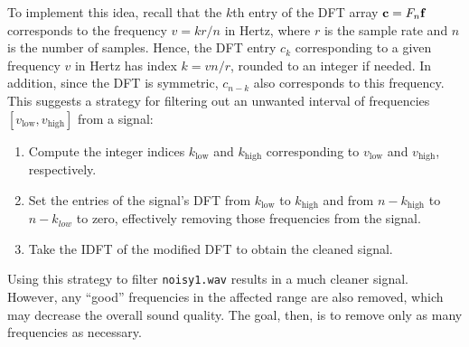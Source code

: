 To implement this idea, recall that the $k$th entry of the DFT array $\mathbf{c} = F_n \mathbf{f}$ corresponds to the frequency $v = k r / n$ in Hertz, where $r$ is the sample rate and $n$ is the number of samples.
Hence, the DFT entry $c_k$ corresponding to a given frequency $v$ in Hertz has index $k = v n / r$, rounded to an integer if needed.
In addition, since the DFT is symmetric, $c_{n-k}$ also corresponds to this frequency. %
This suggests a strategy for filtering out an unwanted interval of frequencies $[v_\text{low},v_\text{high}]$ from a signal:
\begin{enumerate}
\item Compute the integer indices $k_\text{low}$ and $k_\text{high}$ corresponding to $v_\text{low}$ and $v_\text{high}$, respectively.
\item Set the entries of the signal's DFT from $k_\text{low}$ to $k_\text{high}$ and from $n-k_\text{high}$ to $n-k_{low}$ to zero, effectively removing those frequencies from the signal.
\item Take the IDFT of the modified DFT to obtain the cleaned signal.
\end{enumerate}
Using this strategy to filter \texttt{noisy1.wav} results in a much cleaner signal. %
However, any ``good'' frequencies in the affected range are also removed, which may decrease the overall sound quality.
The goal, then, is to remove only as many frequencies as necessary.

